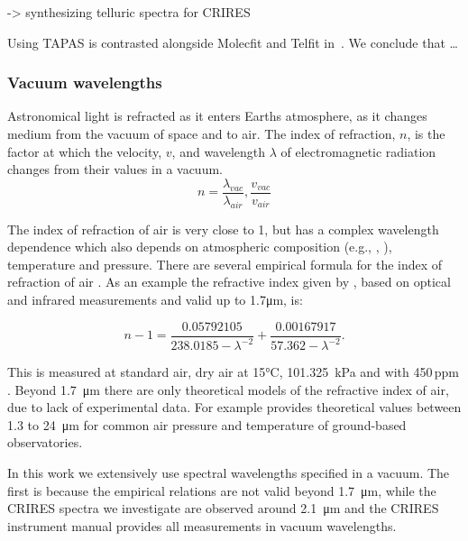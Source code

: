  -> synthesizing telluric spectra \nir{} for {CRIRES}~\cite{seifahrt_synthesising_2010}

Using {TAPAS} is contrasted alongside Molecfit and Telfit in~\cite{ulmer-moll_telluric_2018}. We conclude that \ldots



\subsubsection{Vacuum wavelengths}
Astronomical light is refracted as it enters Earths atmosphere, as it changes medium from the vacuum of space and to air. The index of refraction, \(n\), is the factor at which the velocity, \(v\), and wavelength \(\lambda\) of electromagnetic radiation changes from their values in a vacuum.
\begin{equation}
n  = \frac{\lambda_{vac}}{\lambda_{air}}, \frac{v_{vac}}{v_{air}}
\end{equation}

The index of refraction of air is very close to 1, but has a complex wavelength dependence which also depends on atmospheric composition (e.g., , ), temperature and pressure.
There are several empirical formula for the index of refraction of air \citep[e.g.,][]{edlen_dispersion_1953, peck_dispersion_1972, ciddor_refractive_1996}. As an example the refractive index given by \citet{ciddor_refractive_1996}, based on optical and infrared measurements and valid up to 1.7\si{\micro\meter}, is:

\begin{equation}
    n -1 = \frac{0.05792105}{238.0185 - \lambda^{-2}} + \frac{0.00167917}{57.362 - \lambda^{-2}}.
\end{equation}

This is measured at standard air, dry air at 15\si{\degreeCelsius}, 101.325\ \si{\kilo\pascal} and with 450\,ppm .
Beyond 1.7\ \si{\micro\meter} there are only theoretical models of the refractive index of air, due to lack of experimental data. For example \citet{mathar_refractive_2007} provides theoretical values between 1.3 to 24\ \si{\micro\meter} for common air pressure and temperature of ground-based observatories.

In this work we extensively use spectral wavelengths specified in a vacuum. The first is because the empirical relations are not valid beyond 1.7\ \si{\micro\meter}, while the {CRIRES} spectra we investigate are observed around 2.1\ \si{\micro\meter} and the {CRIRES} instrument manual provides all measurements in vacuum wavelengths.

